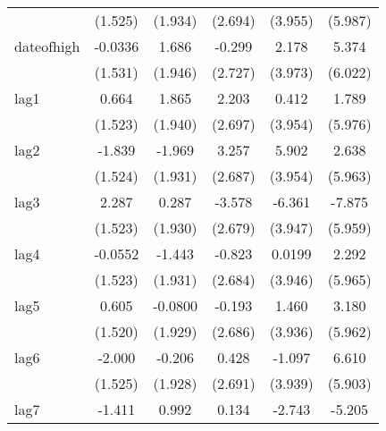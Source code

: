 {\begin{tabular}{l*{5}{c}}
            &     (1.525)         &     (1.934)         &     (2.694)         &     (3.955)         &     (5.987)         \\
[1em]
dateofhigh  &     -0.0336         &       1.686         &      -0.299         &       2.178         &       5.374         \\
            &     (1.531)         &     (1.946)         &     (2.727)         &     (3.973)         &     (6.022)         \\
[1em]
lag1        &       0.664         &       1.865         &       2.203         &       0.412         &       1.789         \\
            &     (1.523)         &     (1.940)         &     (2.697)         &     (3.954)         &     (5.976)         \\
[1em]
lag2        &      -1.839         &      -1.969         &       3.257         &       5.902         &       2.638         \\
            &     (1.524)         &     (1.931)         &     (2.687)         &     (3.954)         &     (5.963)         \\
[1em]
lag3        &       2.287         &       0.287         &      -3.578         &      -6.361         &      -7.875         \\
            &     (1.523)         &     (1.930)         &     (2.679)         &     (3.947)         &     (5.959)         \\
[1em]
lag4        &     -0.0552         &      -1.443         &      -0.823         &      0.0199         &       2.292         \\
            &     (1.523)         &     (1.931)         &     (2.684)         &     (3.946)         &     (5.965)         \\
[1em]
lag5        &       0.605         &     -0.0800         &      -0.193         &       1.460         &       3.180         \\
            &     (1.520)         &     (1.929)         &     (2.686)         &     (3.936)         &     (5.962)         \\
[1em]
lag6        &      -2.000         &      -0.206         &       0.428         &      -1.097         &       6.610         \\
            &     (1.525)         &     (1.928)         &     (2.691)         &     (3.939)         &     (5.903)         \\
[1em]
lag7        &      -1.411         &       0.992         &       0.134         &      -2.743         &      -5.205         \\

\end{tabular}}
